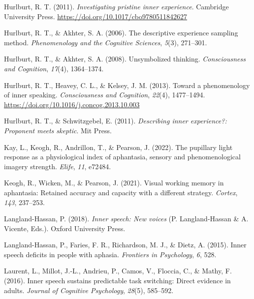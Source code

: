 \documentclass[
  man,a4paper,floatsintext]{apa6}
\newlength{\cslhangindent}
\newlength{\cslentryspacingunit} %
\newenvironment{CSLReferences}[2] %
 {%
  \setlength{\parindent}{0pt}
  \ifodd #1
  \let\oldpar\par
  \def\par{\hangindent=\cslhangindent\oldpar}
  \fi
  \setlength{\parskip}{#2\cslentryspacingunit}
 }%
 {}
\begin{document}
\begin{CSLReferences}{1}{0}
\leavevmode{}%
Hurlburt, R. T. (2011). \emph{Investigating pristine inner experience}. Cambridge University Press. \url{https://doi.org/10.1017/cbo9780511842627}

\leavevmode{}%
Hurlburt, R. T., \& Akhter, S. A. (2006). The descriptive experience sampling method. \emph{Phenomenology and the Cognitive Sciences}, \emph{5}(3), 271--301.

\leavevmode{}%
Hurlburt, R. T., \& Akhter, S. A. (2008). Unsymbolized thinking. \emph{Consciousness and Cognition}, \emph{17}(4), 1364--1374.

\leavevmode{}%
Hurlburt, R. T., Heavey, C. L., \& Kelsey, J. M. (2013). Toward a phenomenology of inner speaking. \emph{Consciousness and Cognition}, \emph{22}(4), 1477--1494. \url{https://doi.org/10.1016/j.concog.2013.10.003}

\leavevmode{}%
Hurlburt, R. T., \& Schwitzgebel, E. (2011). \emph{Describing inner experience?: Proponent meets skeptic}. Mit Press.

\leavevmode{}%
Kay, L., Keogh, R., Andrillon, T., \& Pearson, J. (2022). The pupillary light response as a physiological index of aphantasia, sensory and phenomenological imagery strength. \emph{Elife}, \emph{11}, e72484.

\leavevmode{}%
Keogh, R., Wicken, M., \& Pearson, J. (2021). Visual working memory in aphantasia: Retained accuracy and capacity with a different strategy. \emph{Cortex}, \emph{143}, 237--253.

\leavevmode{}%
Langland-Hassan, P. (2018). \emph{Inner speech: New voices} (P. Langland-Hassan \& A. Vicente, Eds.). Oxford University Press.

\leavevmode{}%
Langland-Hassan, P., Faries, F. R., Richardson, M. J., \& Dietz, A. (2015). Inner speech deficits in people with aphasia. \emph{Frontiers in Psychology}, \emph{6}, 528.

\leavevmode{}%
Laurent, L., Millot, J.-L., Andrieu, P., Camos, V., Floccia, C., \& Mathy, F. (2016). Inner speech sustains predictable task switching: Direct evidence in adults. \emph{Journal of Cognitive Psychology}, \emph{28}(5), 585--592.


\end{CSLReferences}
\end{document}
